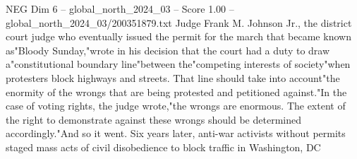 \begin{textsample}{NEG Dim 6 – global\_north\_2024\_03 – Score 1.00 – global\_north\_2024\_03/200351879.txt}
Judge Frank M.
Johnson Jr., the district court judge who eventually issued the permit for the march that became known as"Bloody Sunday,"wrote in his decision that the court had a duty to draw a"constitutional boundary line"between the"competing interests of society"when protesters block highways and streets.
That line should take into account"the enormity of the wrongs that are being protested and petitioned against."In the case of voting rights, the judge wrote,"the wrongs are enormous.
The extent of the right to demonstrate against these wrongs should be determined accordingly."And so it went.
Six years later, anti-war activists without permits staged mass acts of civil disobedience to block traffic in Washington, DC

\end{textsample}
